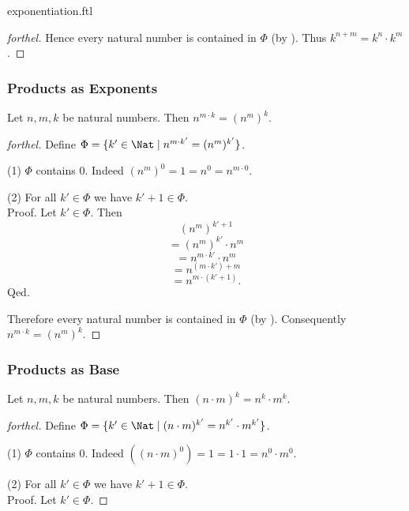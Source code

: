 \documentclass{naproche-library}
\begin{document}
\begin{smodule}{exponentiation.ftl}
\begin{proof}[forthel]
    Hence every natural number is contained in $\Phi$ (by ).
    Thus $k^{n + m} = k^{n} \cdot k^{m}$.
  \end{proof}


  \subsubsection*{Products as Exponents}

  \begin{proposition}[forthel,id=ARITHMETIC_09_7827956571308032,printid]
    Let $n, m, k$ be natural numbers.
    Then $n^{m \cdot k} = (n^{m})^{k}$.
  \end{proposition}
  \begin{proof}[forthel]
    Define $\Phi = \{ k' \in \Nat \mid n^{m \cdot k'} = (n^{m})^{k'} \}$.

    (1) $\Phi$ contains $0$.
    Indeed $(n^{m})^{0}
      = 1
      = n^{0}
      = n^{m \cdot 0}$.

    (2) For all $k' \in \Phi$ we have $k' + 1 \in \Phi$. \\
    Proof.
      Let $k' \in \Phi$.
      Then
      \[  (n^{m})^{k' + 1}                \]
      \[    = (n^{m})^{k'} \cdot n^{m}    \]
      \[    = n^{m \cdot k'} \cdot n^{m}  \]
      \[    = n^{(m \cdot k') + m}        \]
      \[    = n^{m \cdot (k' + 1)}.       \]
    Qed.

    Therefore every natural number is contained in $\Phi$ (by ).
    Consequently $n^{m \cdot k} = (n^{m})^{k}$.
  \end{proof}


  \subsubsection*{Products as Base}

  \begin{proposition}[forthel,id=ARITHMETIC_09_2563032276271104,printid]
    Let $n, m, k$ be natural numbers.
    Then $(n \cdot m)^{k} = n^{k} \cdot m^{k}$.
  \end{proposition}
  \begin{proof}[forthel]
    Define $\Phi = \{ k' \in \Nat \mid (n \cdot m)^{k'} = n^{k'} \cdot m^{k'} \}$.

    (1) $\Phi$ contains $0$.
    Indeed $((n \cdot m)^{0})
      = 1
      = 1 \cdot 1
      = n^{0} \cdot m^{0}$. %

    (2) For all $k' \in \Phi$ we have $k' + 1 \in \Phi$. \\
    Proof.
      Let $k' \in \Phi$.


\end{proof}
\end{smodule}
\end{document}
